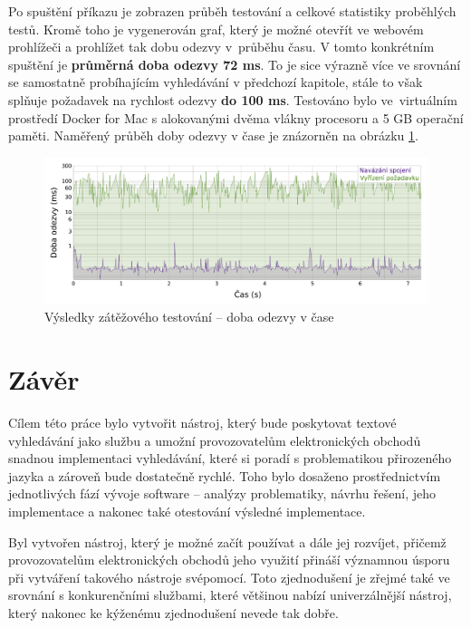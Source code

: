 \documentclass[FM,DP]{tulthesis}
\begin{document}
Po spuštění příkazu je zobrazen průběh testování a celkové statistiky proběhlých testů. Kromě
toho je vygenerován graf, který je možné otevřít ve webovém prohlížeči a prohlížet tak dobu 
odezvy v~průběhu času. V tomto konkrétním spuštění je \textbf{průměrná doba odezvy 72 ms}.
To je sice výrazně více ve srovnání se samostatně probíhajícím vyhledávání v předchozí kapitole, 
stále to však splňuje požadavek na rychlost odezvy \textbf{do 100 ms}. Testováno bylo ve~virtuálním 
prostředí Docker for Mac s alokovanými dvěma vlákny procesoru a 5 GB operační paměti. 
Naměřený průběh doby odezvy v čase je znázorněn na obrázku \ref{sniper}.

\begin{figure}[h]
\center
\includegraphics[width=\textwidth]{sniper.pdf}
\caption[Výsledky zátěžového testu]{Výsledky zátěžového testování -- doba odezvy v čase}
\label{sniper}
\end{figure}


\chapter{Závěr}

Cílem této práce bylo vytvořit nástroj, který bude poskytovat textové vyhledávání jako službu a 
umožní provozovatelům elektronických obchodů snadnou implementaci vyhledávání, které si poradí
s problematikou přirozeného jazyka a zároveň bude dostatečně rychlé. Toho bylo dosaženo prostřednictvím
jednotlivých fází vývoje software -- analýzy problematiky, návrhu řešení, jeho implementace a nakonec
také otestování výsledné implementace.

Byl vytvořen nástroj, který je možné začít používat a dále jej rozvíjet, přičemž provozovatelům
elektronických obchodů jeho využití přináší významnou úsporu při vytváření takového nástroje
svépomocí. Toto zjednodušení je zřejmé také ve srovnání s konkurenčními službami, které většinou
nabízí univerzálnější nástroj, který nakonec ke kýženému zjednodušení nevede tak dobře.
\end{document}
